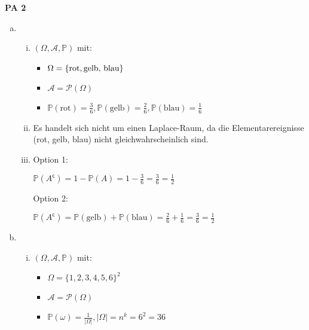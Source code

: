 \documentclass[a4paper,12pt]{article}
\newcommand{\PAufgabe}[1]{
        {
        \vspace*{0.5cm}
        \textbf{PA #1}
        \vspace*{0.2cm}
    }
}
\begin{document}
    \PAufgabe{2}
    \begin{enumerate}[(a)]
        \item 

        \begin{enumerate}[i.]
        \item 

        $ (\Omega, \mathcal{A}, \mathbb{P}) $ mit:
        \begin{itemize}
            \item $ \Omega = \{\text{rot}, \text{gelb, \text{blau}}\} $
            \item $ \mathcal{A} = \mathcal{P}(\Omega) $
            \item $ \mathbb{P}(\text{rot}) = \frac{3}{6}, \mathbb{P}(\text{gelb}) = \frac{2}{6}, \mathbb{P}(\text{blau}) = \frac{1}{6} $
        \end{itemize}

        \item

        Es handelt sich nicht um einen Laplace-Raum, da die Elementarereignisse (rot, gelb, blau) nicht gleichwahrscheinlich sind.

        \item

        Option 1:

        $ \mathbb{P}(A^{\mathsf{c}}) = 1 - \mathbb{P}(A) = 1 - \frac{3}{6} = \frac{3}{6} = \frac{1}{2} $

        \smallskip

        Option 2:

        $ \mathbb{P}(A^{\mathsf{c}}) = \mathbb{P}(\text{gelb}) + \mathbb{P}(\text{blau}) = \frac{2}{6} + \frac{1}{6} = \frac{3}{6} = \frac{1}{2} $
        \end{enumerate}

        \item

        \begin{enumerate}[i.]
        \item 

        $ (\Omega, \mathcal{A}, \mathbb{P}) $ mit:
        \begin{itemize}
            \item $ \Omega = \{1, 2, 3, 4, 5, 6\}^2 $
            \item $ \mathcal{A} = \mathcal{P}(\Omega) $
            \item $ \mathbb{P}(\omega) = \frac{1}{|\Omega|}, |\Omega| = n^k = 6^2 = 36 $
        \end{itemize}


\end{enumerate}
\end{enumerate}
\end{document}
